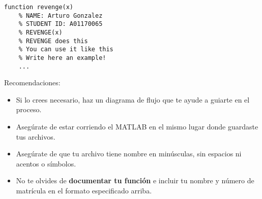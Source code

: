 \documentclass[]{book}
\theoremstyle{definition}
\begin{document}
\bigskip

\begin{lstlisting}[style=Matlab-editor]
    function revenge(x)
    % NAME: Arturo Gonzalez
    % STUDENT ID: A01170065
    % REVENGE(x)
    % REVENGE does this
    % You can use it like this
    % Write here an example!
    ...
\end{lstlisting}

\pagebreak

{\Large Recomendaciones:}
\begin{itemize}
    \item Si lo crees necesario, haz un diagrama de flujo que te ayude a guiarte en el proceso.
    \item Asegúrate de estar corriendo el MATLAB en el mismo lugar donde guardaste tus archivos.
    \item Asegúrate de que tu archivo tiene nombre en minúsculas, sin espacios ni acentos o símbolos. 
    \item No te olvides de \textbf{documentar tu función} e incluir tu nombre y número de matrícula en el formato especificado arriba.
\end{itemize}
\end{document}
